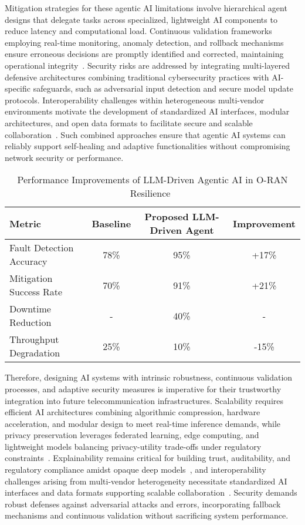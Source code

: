 \documentclass[sigconf]{acmart}
\begin{document}
Mitigation strategies for these agentic AI limitations involve hierarchical agent designs that delegate tasks across specialized, lightweight AI components to reduce latency and computational load. Continuous validation frameworks employing real-time monitoring, anomaly detection, and rollback mechanisms ensure erroneous decisions are promptly identified and corrected, maintaining operational integrity~\cite{ref55}. Security risks are addressed by integrating multi-layered defensive architectures combining traditional cybersecurity practices with AI-specific safeguards, such as adversarial input detection and secure model update protocols. Interoperability challenges within heterogeneous multi-vendor environments motivate the development of standardized AI interfaces, modular architectures, and open data formats to facilitate secure and scalable collaboration~\cite{ref55}. Such combined approaches ensure that agentic AI systems can reliably support self-healing and adaptive functionalities without compromising network security or performance.

\begin{table*}[htbp]
\centering
\caption{Performance Improvements of LLM-Driven Agentic AI in O-RAN Resilience~\cite{ref55}}
\label{tab:llm_o-ran_performance}
\begin{adjustbox}{max width=\textwidth}
\begin{tabular}{@{}lccc@{}}
\toprule
Metric & Baseline & Proposed LLM-Driven Agent & Improvement \\
\midrule
Fault Detection Accuracy & 78\% & 95\% & +17\% \\
Mitigation Success Rate & 70\% & 91\% & +21\% \\
Downtime Reduction & - & 40\% & - \\
Throughput Degradation & 25\% & 10\% & -15\% \\
\bottomrule
\end{tabular}
\end{adjustbox}
\end{table*}

Therefore, designing AI systems with intrinsic robustness, continuous validation processes, and adaptive security measures is imperative for their trustworthy integration into future telecommunication infrastructures. Scalability requires efficient AI architectures combining algorithmic compression, hardware acceleration, and modular design to meet real-time inference demands, while privacy preservation leverages federated learning, edge computing, and lightweight models balancing privacy-utility trade-offs under regulatory constraints~\cite{ref48,ref50}. Explainability remains critical for building trust, auditability, and regulatory compliance amidst opaque deep models~\cite{ref50}, and interoperability challenges arising from multi-vendor heterogeneity necessitate standardized AI interfaces and data formats supporting scalable collaboration~\cite{ref55}. Security demands robust defenses against adversarial attacks and errors, incorporating fallback mechanisms and continuous validation without sacrificing system performance.
\end{document}
